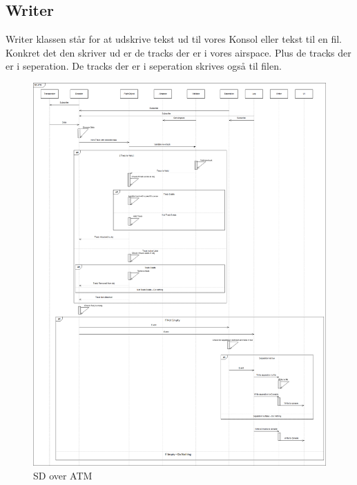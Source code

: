 \subsection{Writer}
Writer klassen står for at udskrive tekst ud til vores Konsol eller tekst til en fil. Konkret det den skriver ud er de tracks der er i vores airspace. Plus de tracks der er i seperation. De tracks der er i seperation skrives også til filen.

\begin{figure}[H]
	\centering
	\includegraphics[width=1\linewidth]{../Diagrammer/SD_ATM}
	\caption{SD over ATM}
	\label{fig:sdatm}
\end{figure}

